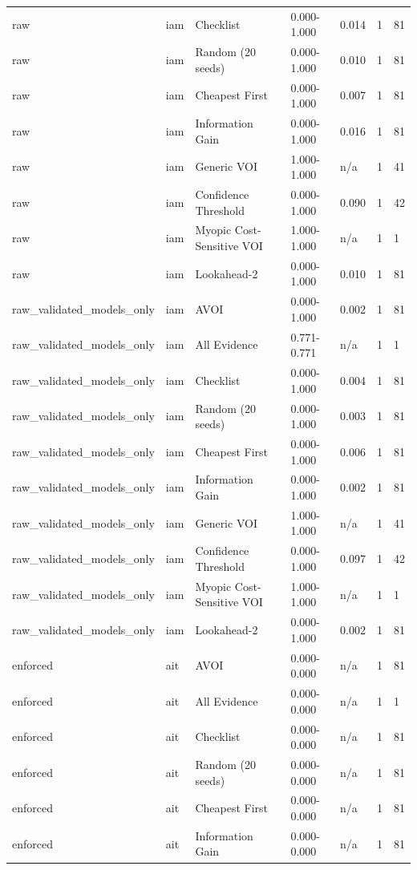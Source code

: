 \begin{table}[!ht]
{\begin{tabular}{lllllll}
raw & iam & Checklist & 0.000-1.000 & 0.014 & 1 & 81 \\
raw & iam & Random (20 seeds) & 0.000-1.000 & 0.010 & 1 & 81 \\
raw & iam & Cheapest First & 0.000-1.000 & 0.007 & 1 & 81 \\
raw & iam & Information Gain & 0.000-1.000 & 0.016 & 1 & 81 \\
raw & iam & Generic VOI & 1.000-1.000 & n/a & 1 & 41 \\
raw & iam & Confidence Threshold & 0.000-1.000 & 0.090 & 1 & 42 \\
raw & iam & Myopic Cost-Sensitive VOI & 1.000-1.000 & n/a & 1 & 1 \\
raw & iam & Lookahead-2 & 0.000-1.000 & 0.010 & 1 & 81 \\
raw\_validated\_models\_only & iam & AVOI & 0.000-1.000 & 0.002 & 1 & 81 \\
raw\_validated\_models\_only & iam & All Evidence & 0.771-0.771 & n/a & 1 & 1 \\
raw\_validated\_models\_only & iam & Checklist & 0.000-1.000 & 0.004 & 1 & 81 \\
raw\_validated\_models\_only & iam & Random (20 seeds) & 0.000-1.000 & 0.003 & 1 & 81 \\
raw\_validated\_models\_only & iam & Cheapest First & 0.000-1.000 & 0.006 & 1 & 81 \\
raw\_validated\_models\_only & iam & Information Gain & 0.000-1.000 & 0.002 & 1 & 81 \\
raw\_validated\_models\_only & iam & Generic VOI & 1.000-1.000 & n/a & 1 & 41 \\
raw\_validated\_models\_only & iam & Confidence Threshold & 0.000-1.000 & 0.097 & 1 & 42 \\
raw\_validated\_models\_only & iam & Myopic Cost-Sensitive VOI & 1.000-1.000 & n/a & 1 & 1 \\
raw\_validated\_models\_only & iam & Lookahead-2 & 0.000-1.000 & 0.002 & 1 & 81 \\
enforced & ait & AVOI & 0.000-0.000 & n/a & 1 & 81 \\
enforced & ait & All Evidence & 0.000-0.000 & n/a & 1 & 1 \\
enforced & ait & Checklist & 0.000-0.000 & n/a & 1 & 81 \\
enforced & ait & Random (20 seeds) & 0.000-0.000 & n/a & 1 & 81 \\
enforced & ait & Cheapest First & 0.000-0.000 & n/a & 1 & 81 \\
enforced & ait & Information Gain & 0.000-0.000 & n/a & 1 & 81 \\

\end{tabular}}
\end{table}
